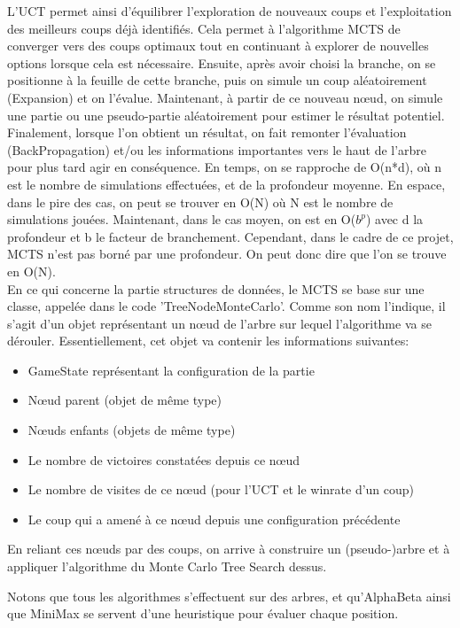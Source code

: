 \documentclass{article}
\begin{document}
\begin{itemize}
    L’UCT permet ainsi d’équilibrer l’exploration de nouveaux coups et l’exploitation des meilleurs coups déjà identifiés.
    Cela permet à l’algorithme MCTS de converger vers des coups optimaux tout en continuant à explorer de nouvelles options lorsque cela est nécessaire.
    Ensuite, après avoir choisi la branche, on se positionne à la feuille de cette branche,
    puis on simule un coup aléatoirement (Expansion) et on l'évalue. Maintenant, à partir de ce nouveau nœud, on simule une partie ou une pseudo-partie
    aléatoirement pour estimer le résultat potentiel. Finalement, lorsque l'on obtient un résultat, on fait remonter l'évaluation (BackPropagation)
    et/ou les informations importantes vers le haut de l'arbre pour plus tard agir en conséquence. En temps, on se rapproche de O(n*d), où n est le
    nombre de simulations effectuées, et de la profondeur moyenne. En espace, dans le pire des cas, on peut se trouver en O(N) où N est le nombre
    de simulations jouées. Maintenant, dans le cas moyen, on est en O($b^p$) avec d la profondeur et b le facteur de branchement.
    Cependant, dans le cadre de ce projet, MCTS n'est pas borné par une profondeur. On peut donc dire que l'on se trouve en O(N).\\
    En ce qui concerne la partie structures de données, le MCTS se base sur une classe, appelée dans le code 'TreeNodeMonteCarlo'.
    Comme son nom l'indique, il s'agit d'un objet représentant un nœud de l'arbre sur lequel l'algorithme va se dérouler.
    Essentiellement, cet objet va contenir les informations suivantes:
    \begin{itemize}
        \item GameState représentant la configuration de la partie
        \item Nœud parent (objet de même type)
        \item Nœuds enfants (objets de même type)
        \item Le nombre de victoires constatées depuis ce nœud
        \item Le nombre de visites de ce nœud (pour l'UCT et le winrate d'un coup)
        \item Le coup qui a amené à ce nœud depuis une configuration précédente
    \end{itemize}
    En reliant ces nœuds par des coups, on arrive à construire un (pseudo-)arbre et à appliquer l'algorithme du Monte Carlo Tree Search dessus.
\end{itemize}

Notons que tous les algorithmes s'effectuent sur des arbres, et qu'AlphaBeta ainsi que MiniMax se servent d'une heuristique pour évaluer chaque position.
\end{document}
